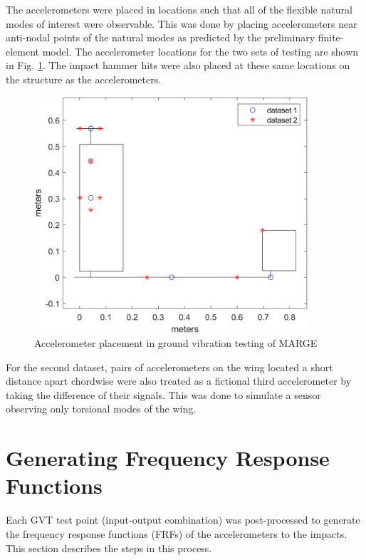 The accelerometers were placed in locations such that all of the flexible natural modes of interest were observable. This was done by placing accelerometers near anti-nodal points of the natural modes as predicted by the preliminary finite-element model. The accelerometer locations for the two sets of testing are shown in Fig. \ref{fig:accelPlacement}. The impact hammer hits were also placed at these same locations on the structure as the accelerometers.

\begin{figure}[h]
    \centering
    \includegraphics[width=4in]{figs/GVT/accelLocPlot.png}
    \caption{Accelerometer placement in ground vibration testing of MARGE}
    \label{fig:accelPlacement}
\end{figure}

For the second dataset, pairs of accelerometers on the wing located a short distance apart chordwise were also treated as a fictional third accelerometer by taking the difference of their signals. This was done to simulate a sensor observing only torsional modes of the wing.

\section{Generating Frequency Response Functions} %
\label{sec:generateFRF}

Each GVT test point (input-output combination) was post-processed to generate the frequency response functions (FRFs) of the accelerometers to the impacts. This section describes the steps in this process.

